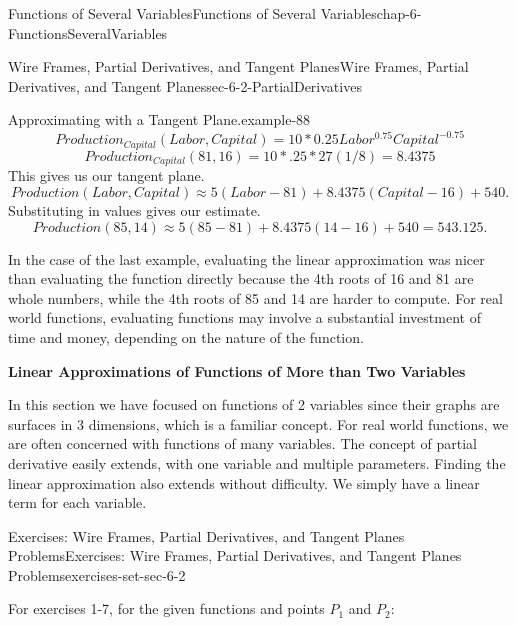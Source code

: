 \documentclass[oneside,10pt,]{book}
\newcommand{\terminology}[1]{\textbf{#1}}
\numberwithin{equation}{section}
\begin{document}
\begin{chapterptx}{Functions of Several Variables}{}{Functions of Several Variables}{}{}{chap-6-FunctionsSeveralVariables}
\begin{sectionptx}{Wire Frames, Partial Derivatives, and Tangent Planes}{}{Wire Frames, Partial Derivatives, and Tangent Planes}{}{}{sec-6-2-PartialDerivatives}
\begin{example}{Approximating with a Tangent Plane.}{example-88}
%
\begin{equation*}
Production_{Capital} (Labor,Capital)=10*{0.25} Labor^{0.75 }  Capital^{-0.75}
\end{equation*}
%
\begin{equation*}
Production_{Capital} (81,16)=10*.25 *27 (1/8)=8.4375
\end{equation*}
\hypertarget{p-2237}{}%
This gives us our tangent plane.%
%
\begin{equation*}
Production(Labor,Capital)\approx5(Labor-81)+8.4375(Capital-16)+540.
\end{equation*}
\hypertarget{p-2238}{}%
Substituting in values gives our estimate.%
%
\begin{equation*}
Production(85,14)\approx 5(85-81)+8.4375(14-16)+540=543.125.
\end{equation*}
\end{example}
\hypertarget{p-2239}{}%
In the case of the last example, evaluating the linear approximation was nicer than evaluating the function directly because the 4th roots of 16 and 81 are whole numbers, while the 4th roots of 85 and 14 are harder to compute.  For real world functions, evaluating functions may involve a substantial investment of time and money, depending on the nature of the function.%
\par
\hypertarget{p-2240}{}%
\terminology{Linear Approximations of Functions of More than Two Variables}%
\par
\hypertarget{p-2241}{}%
In this section we have focused on functions of 2 variables since their graphs are surfaces in 3 dimensions, which is a familiar concept.  For real world functions, we are often concerned with functions of many variables.  The concept of partial derivative easily extends, with one variable and multiple parameters.  Finding the linear approximation also extends without difficulty.  We simply have a linear term for each variable.%
%
%
\typeout{************************************************}
\typeout{************************************************}
%
\begin{exercises-subsection-numberless}{Exercises: Wire Frames, Partial Derivatives, and Tangent Planes Problems}{}{Exercises: Wire Frames, Partial Derivatives, and Tangent Planes Problems}{}{}{exercises-set-sec-6-2}
\par\medskip\noindent%
\hypertarget{exercisegroup-27}{}%
\hypertarget{p-2242}{}%
For exercises 1-7, for the given functions and points \(P_1\) and \(P_2\):%

\end{exercises-subsection-numberless}
\end{sectionptx}
\end{chapterptx}
\end{document}
